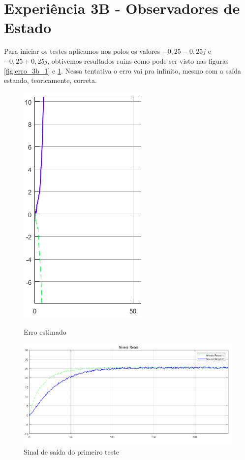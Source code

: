 \documentclass[
	12pt,				%
	openany,			%
	oneside,			%
	a4paper,			%
	english,			%
	french,				%
	spanish,			%
	brazil,				%
	]{abntex2}
\begin{document}
{\clearpage
\section{Experiência 3B - Observadores de Estado}

Para iniciar os testes aplicamos nos polos os valores $-0,25-0,25j$ e $-0,25+0,25j$, obtivemos resultados ruins como pode ser visto nas figuras \ref{fig:erro_3b_1} e \ref{fig:saida_3b_1}. Nessa tentativa o erro vai pra infinito, mesmo com a saída estando, teoricamente, correta.

\begin{figure}[h]
	\centering
	\begin{minipage}{.5\textwidth}
		\centering
		\includegraphics[scale=0.30]{imagens/erro_3b_1.png}
		\caption{Erro estimado}
		\label{fig:erro_3b_1}		
	\end{minipage}%
	\begin{minipage}{.5\textwidth}
		\centering
		\includegraphics[scale=0.30]{imagens/saida_3b_1.png}
		\caption{Sinal de saída do primeiro teste}
		\label{fig:saida_3b_1}		
	\end{minipage}
\end{figure}

}
\end{document}
